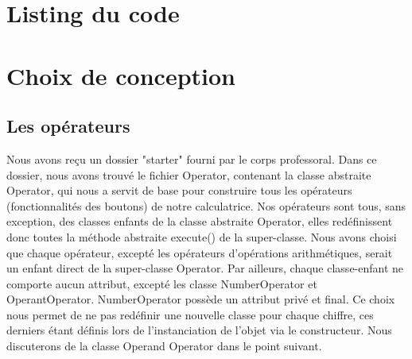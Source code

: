 \documentclass[12pt]{report}
\begin{document}
    \section*{Listing du code}
    
    
    
    
    

    \section*{Choix de conception}
        \subsection*{Les opérateurs}
            Nous avons reçu un dossier "starter" fourni par le corps professoral. Dans ce dossier, nous avons trouvé le
    fichier Operator, contenant la classe abstraite Operator, qui nous a servit de base pour construire tous les opérateurs (fonctionnalités des boutons) de notre
    calculatrice.
    \newline Nos opérateurs sont tous, sans exception, des classes enfants de la classe abstraite Operator, elles redéfinissent
    donc toutes la méthode abstraite execute() de la super-classe.
    Nous avons choisi que chaque opérateur, excepté les opérateurs d'opérations arithmétiques, serait un enfant direct de la
    super-classe Operator.
    \newline
    Par ailleurs, chaque classe-enfant ne comporte aucun attribut, excepté les classe NumberOperator et OperantOperator.
    NumberOperator possède un attribut privé et final. Ce choix nous permet de ne pas redéfinir une nouvelle classe pour chaque
    chiffre, ces derniers étant définis lors de l'instanciation de l'objet via le constructeur.
    \newline Nous discuterons de la classe Operand Operator dans le point suivant.
\end{document}
